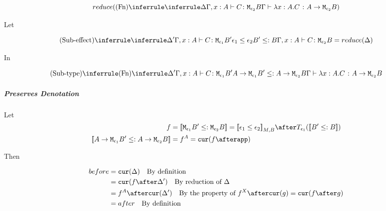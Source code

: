 {            \begin{equation}
                \reduce(\ntreeruleI{Fn}{
                    \treeruleI{\D}{\typerelation{\gax}{C}{\M{\e_2}{B}}}
                }{\gtyperelation{\lam{x}{A}{C}}{\lamtype{A}{\e_2}{B}}})
            \end{equation}

            Let 

            \begin{equation}
                \ntreeruleII{Sub-effect}{
                    \treeruleI{\D'}{\typerelation{\gax}{C}{\M{\e_1}{B'}}}
                    }{
                    \e_1\subeffect\e_2
                    }{
                    B' \subtype B
                }{
                    \typerelation{\gax}{C}{\M{\e_2}{B}}
                } = \reduce(\D)
            \end{equation}

            In

            \begin{equation}
                \ntreeruleII{Sub-type}{
                    \ntreeruleI{Fn}{
                        \D'
                    }{
                        \typerelation{\gax}{C}{\M{\e_1}{B'}}
                    }
                    }{
                    \lamtype{A}{\e_1}{B'}\subtype\lamtype{A}{\e_2}{B}
                } {
                    \gtyperelation{\lam{x}{A}{C}}{\lamtype{A}{\e_2}{B}}
                }
            \end{equation}

        \subparagraph{Preserves Denotation}
            Let
            \begin{align}
                f &= \deno{\M{\e_1}{B'}\subtype\M{\e_2}{B}} = \db{\e_1\subeffect\e_2}_{M, B}\after\T{\e_1}{(\deno{B'\subtype B})} \\
                \deno{\lamtype{A}{\e_1}{B'}\subtype\lamtype{A}{\e_2}{B}} & = f^A = \cur{f\after \app}
            \end{align}

            Then

            \begin{align}
                before & = \cur{\D} \qt{By definition}\\
                        & = \cur{f\after\D'} \qt{By reduction of $\D$} \\
                        & = f^A\after\cur{\D'}\qt{By the property of $f^X\after\cur{g} = \cur{f\after g}$} \\
                        & = after \qt{By definition}\\
            \end{align}

}
